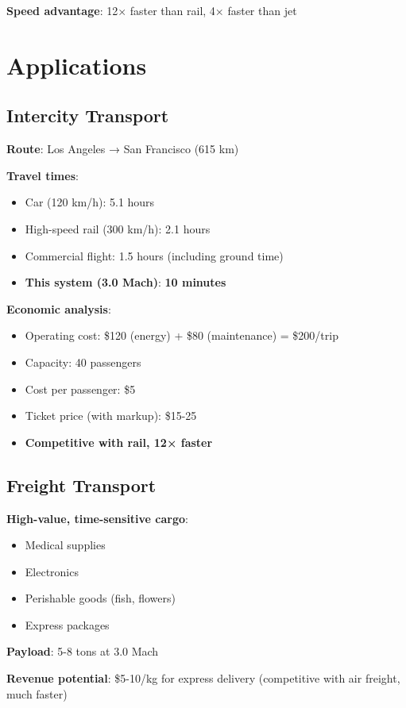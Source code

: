 \documentclass[12pt,a4paper]{article}
\begin{document}
\textbf{Speed advantage}: 12× faster than rail, 4× faster than jet

\section{Applications}

\subsection{Intercity Transport}

\textbf{Route}: Los Angeles → San Francisco (615 km)

\textbf{Travel times}:
\begin{itemize}
\item Car (120 km/h): 5.1 hours
\item High-speed rail (300 km/h): 2.1 hours
\item Commercial flight: 1.5 hours (including ground time)
\item \textbf{This system (3.0 Mach)}: \textbf{10 minutes}
\end{itemize}

\textbf{Economic analysis}:
\begin{itemize}
\item Operating cost: \$120 (energy) + \$80 (maintenance) = \$200/trip
\item Capacity: 40 passengers
\item Cost per passenger: \$5
\item Ticket price (with markup): \$15-25
\item \textbf{Competitive with rail, 12× faster}
\end{itemize}

\subsection{Freight Transport}

\textbf{High-value, time-sensitive cargo}:
\begin{itemize}
\item Medical supplies
\item Electronics
\item Perishable goods (fish, flowers)
\item Express packages
\end{itemize}

\textbf{Payload}: 5-8 tons at 3.0 Mach

\textbf{Revenue potential}: \$5-10/kg for express delivery (competitive with air freight, much faster)
\end{document}
